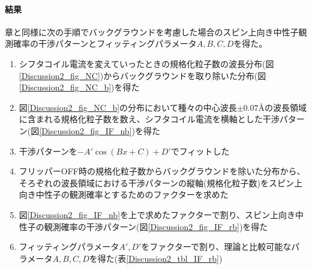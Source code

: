 \paragraph{結果}
章と同様に次の手順でバックグラウンドを考慮した場合のスピン上向き中性子観測確率の干渉パターンとフィッティングパラメータ$A,B,C,D$を得た。
\begin{enumerate}
\item シフタコイル電流を変えていったときの規格化粒子数の波長分布(図\ref{Discussion2_fig_NC})からバックグラウンドを取り除いた分布(図\ref{Discussion2_fig_NC_b})を得た
\item 図\ref{Discussion2_fig_NC_b}の分布において種々の中心波長$\pm0.07$\AA の波長領域に含まれる規格化粒子数を数え、シフタコイル電流を横軸とした干渉パターン(図\ref{Discussion2_fig_IF_nb})を得た
\item 干渉パターンを$-A'\cos(Bx+C)+D'$でフィットした
\item フリッパーOFF時の規格化粒子数からバックグラウンドを除いた分布から、そろぞれの波長領域における干渉パターンの縦軸(規格化粒子数)をスピン上向き中性子の観測確率とするためのファクターを求めた
\item 図\ref{Discussion2_fig_IF_nb}を上で求めたファクターで割り、スピン上向き中性子の観測確率の干渉パターン(図\ref{Discussion2_fig_IF_rb})を得た
\item フィッティングパラメータ$A',D'$をファクターで割り、理論と比較可能なパラメータ$A,B,C,D$を得た(表\ref{Discussion2_tbl_IF_rb})
\end{enumerate}


